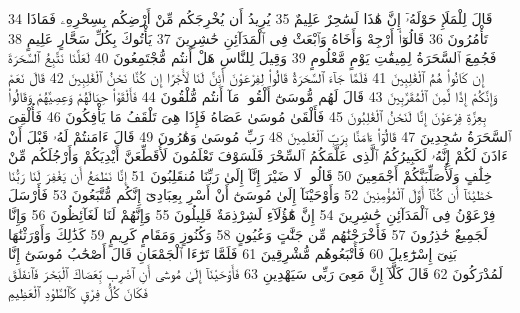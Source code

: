 {\tiny\colorbox{cl_aya}{34}} قَالَ لِلْمَلَإِ حَوْلَهُۥٓ إِنَّ هَٰذَا لَسَٰحِرٌ عَلِيمٌ
{\tiny\colorbox{cl_aya}{35}} يُرِيدُ أَن يُخْرِجَكُم مِّنْ أَرْضِكُم بِسِحْرِهِۦ فَمَاذَا تَأْمُرُونَ
{\tiny\colorbox{cl_aya}{36}} قَالُوٓا۟ أَرْجِهْ وَأَخَاهُ وَٱبْعَثْ فِى ٱلْمَدَآئِنِ حَٰشِرِينَ
{\tiny\colorbox{cl_aya}{37}} يَأْتُوكَ بِكُلِّ سَحَّارٍ عَلِيمٍ
{\tiny\colorbox{cl_aya}{38}} فَجُمِعَ ٱلسَّحَرَةُ لِمِيقَٰتِ يَوْمٍ مَّعْلُومٍ
{\tiny\colorbox{cl_aya}{39}} وَقِيلَ لِلنَّاسِ هَلْ أَنتُم مُّجْتَمِعُونَ
{\tiny\colorbox{cl_aya}{40}} لَعَلَّنَا نَتَّبِعُ ٱلسَّحَرَةَ إِن كَانُوا۟ هُمُ ٱلْغَٰلِبِينَ
{\tiny\colorbox{cl_aya}{41}} فَلَمَّا جَآءَ ٱلسَّحَرَةُ قَالُوا۟ لِفِرْعَوْنَ أَئِنَّ لَنَا لَأَجْرًا إِن كُنَّا نَحْنُ ٱلْغَٰلِبِينَ
{\tiny\colorbox{cl_aya}{42}} قَالَ نَعَمْ وَإِنَّكُمْ إِذًا لَّمِنَ ٱلْمُقَرَّبِينَ
{\tiny\colorbox{cl_aya}{43}} قَالَ لَهُم مُّوسَىٰٓ أَلْقُوا۟ مَآ أَنتُم مُّلْقُونَ
{\tiny\colorbox{cl_aya}{44}} فَأَلْقَوْا۟ حِبَالَهُمْ وَعِصِيَّهُمْ وَقَالُوا۟ بِعِزَّةِ فِرْعَوْنَ إِنَّا لَنَحْنُ ٱلْغَٰلِبُونَ
{\tiny\colorbox{cl_aya}{45}} فَأَلْقَىٰ مُوسَىٰ عَصَاهُ فَإِذَا هِىَ تَلْقَفُ مَا يَأْفِكُونَ
{\tiny\colorbox{cl_aya}{46}} فَأُلْقِىَ ٱلسَّحَرَةُ سَٰجِدِينَ
{\tiny\colorbox{cl_aya}{47}} قَالُوٓا۟ ءَامَنَّا بِرَبِّ ٱلْعَٰلَمِينَ
{\tiny\colorbox{cl_aya}{48}} رَبِّ مُوسَىٰ وَهَٰرُونَ
{\tiny\colorbox{cl_aya}{49}} قَالَ ءَامَنتُمْ لَهُۥ قَبْلَ أَنْ ءَاذَنَ لَكُمْ إِنَّهُۥ لَكَبِيرُكُمُ ٱلَّذِى عَلَّمَكُمُ ٱلسِّحْرَ فَلَسَوْفَ تَعْلَمُونَ لَأُقَطِّعَنَّ أَيْدِيَكُمْ وَأَرْجُلَكُم مِّنْ خِلَٰفٍ وَلَأُصَلِّبَنَّكُمْ أَجْمَعِينَ
{\tiny\colorbox{cl_aya}{50}} قَالُوا۟ لَا ضَيْرَ إِنَّآ إِلَىٰ رَبِّنَا مُنقَلِبُونَ
{\tiny\colorbox{cl_aya}{51}} إِنَّا نَطْمَعُ أَن يَغْفِرَ لَنَا رَبُّنَا خَطَٰيَٰنَآ أَن كُنَّآ أَوَّلَ ٱلْمُؤْمِنِينَ
{\tiny\colorbox{cl_aya}{52}} وَأَوْحَيْنَآ إِلَىٰ مُوسَىٰٓ أَنْ أَسْرِ بِعِبَادِىٓ إِنَّكُم مُّتَّبَعُونَ
{\tiny\colorbox{cl_aya}{53}} فَأَرْسَلَ فِرْعَوْنُ فِى ٱلْمَدَآئِنِ حَٰشِرِينَ
{\tiny\colorbox{cl_aya}{54}} إِنَّ هَٰٓؤُلَآءِ لَشِرْذِمَةٌ قَلِيلُونَ
{\tiny\colorbox{cl_aya}{55}} وَإِنَّهُمْ لَنَا لَغَآئِظُونَ
{\tiny\colorbox{cl_aya}{56}} وَإِنَّا لَجَمِيعٌ حَٰذِرُونَ
{\tiny\colorbox{cl_aya}{57}} فَأَخْرَجْنَٰهُم مِّن جَنَّٰتٍ وَعُيُونٍ
{\tiny\colorbox{cl_aya}{58}} وَكُنُوزٍ وَمَقَامٍ كَرِيمٍ
{\tiny\colorbox{cl_aya}{59}} كَذَٰلِكَ وَأَوْرَثْنَٰهَا بَنِىٓ إِسْرَٰٓءِيلَ
{\tiny\colorbox{cl_aya}{60}} فَأَتْبَعُوهُم مُّشْرِقِينَ
{\tiny\colorbox{cl_aya}{61}} فَلَمَّا تَرَٰٓءَا ٱلْجَمْعَانِ قَالَ أَصْحَٰبُ مُوسَىٰٓ إِنَّا لَمُدْرَكُونَ
{\tiny\colorbox{cl_aya}{62}} قَالَ كَلَّآ إِنَّ مَعِىَ رَبِّى سَيَهْدِينِ
{\tiny\colorbox{cl_aya}{63}} فَأَوْحَيْنَآ إِلَىٰ مُوسَىٰٓ أَنِ ٱضْرِب بِّعَصَاكَ ٱلْبَحْرَ فَٱنفَلَقَ فَكَانَ كُلُّ فِرْقٍ كَٱلطَّوْدِ ٱلْعَظِيمِ
